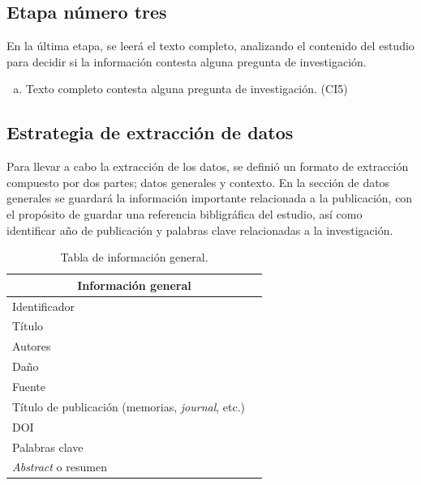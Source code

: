 \documentclass[conference,onecolumn,10pt]{IEEEtran}
\begin{document}
\subsection{Etapa número tres}
En la última etapa, se leerá el texto completo, analizando el contenido del estudio para decidir si 
la información contesta alguna pregunta de investigación. 
\begin{enumerate}[(a)]
  \item{Texto completo contesta alguna pregunta de investigación. (CI5)}
\end{enumerate}
\newpage

\subsection{Estrategia de extracción de datos}
Para llevar a cabo la extracción de los datos, se definió un formato de extracción compuesto por dos partes; datos generales y contexto.
En la sección de datos generales se guardará la información importante relacionada a la publicación, con el propósito de guardar 
una referencia bibligráfica del estudio, así como identificar año de publicación y palabras clave relacionadas a la investigación. 

\begin{table}[h!]
    \begin{center}
    \caption{Tabla de información general.}
    \label{tab:datosgenerales}
    \begin{tabular}{|l|c|} 
    \hline
    \multicolumn{2}{|c|}{Información general} \\
    \hline
    Identificador &       \\
    \hline
    Título & \\
    \hline
    Autores &\\
    \hline
    Daño & \\
    \hline
    Fuente & \\
    \hline
    Título de publicación (memorias, \emph{journal}, etc.) & \\
    \hline
    DOI & \\
    \hline
    Palabras clave & \\
    \hline
    \emph{Abstract} o resumen & \\
    \hline
    \end{tabular}
    \end{center}
\end{table}
\end{document}
